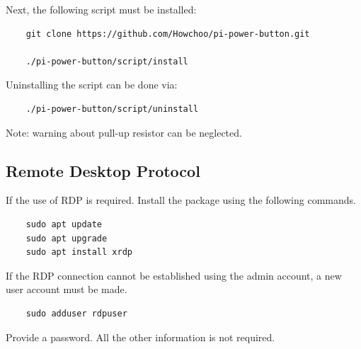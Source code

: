 Next, the following script must be installed:

\begin{verbatim}
	git clone https://github.com/Howchoo/pi-power-button.git
	
	./pi-power-button/script/install
\end{verbatim}

Uninstalling the script can be done via:

\begin{verbatim}
	./pi-power-button/script/uninstall
\end{verbatim}

Note: warning about pull-up resistor can be neglected.

\subsection{Remote Desktop Protocol}
If the use of RDP is required. Install the package using the following commands.

\begin{verbatim}
	sudo apt update
	sudo apt upgrade
	sudo apt install xrdp
\end{verbatim}

If the RDP connection cannot be established using the admin account, a new user account must be made. 

\begin{verbatim}
	sudo adduser rdpuser
\end{verbatim}

Provide a password. All the other information is not required.

